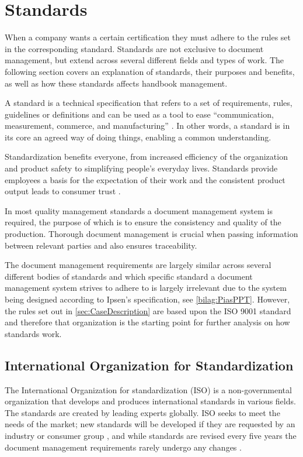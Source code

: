 \section{Standards} \label{sec:standards}
When a company wants a certain certification they must adhere to the rules set in the corresponding standard.
Standards are not exclusive to document management, but extend across several different fields and types of work.
The following section covers an explanation of standards, their purposes and benefits, as well as how these standards affects handbook management.

A standard is a technical specification that refers to a set of requirements, rules, guidelines or definitions \cite{Standard} and can be used as a tool to ease ``communication, measurement, commerce, and manufacturing'' \cite{Standardtool}.
In other words, a standard is in its core an agreed way of doing things, enabling a common understanding.

Standardization benefits everyone, from increased efficiency of the organization and product safety to simplifying people's everyday lives.
Standards provide employees a basis for the expectation of their work and the consistent product output leads to consumer trust \citep[p.~83]{Standardization}.

In most quality management standards a document management system is required, the purpose of which is to ensure the consistency and quality of the production.
Thorough document management is crucial when passing information between relevant parties and also ensures traceability.

The document management requirements are largely similar across several different bodies of standards and which specific standard a document management system strives to adhere to is largely irrelevant due to the system being designed according to Ipsen's specification, see \cref{bilag:PiasPPT}.
However, the rules set out in \cref{sec:CaseDescription} are based upon the ISO 9001 standard and therefore that organization is the starting point for further analysis on how standards work.

\subsection{International Organization for Standardization} \label{sec:ISOstandards}
The International Organization for standardization (ISO) is a non-governmental organization that develops and produces international standards in various fields.
The standards are created by leading experts globally. \cite{ISOinfo}
ISO seeks to meet the needs of the market; new standards will be developed if they are requested by an industry or consumer group \cite{ISOdeveloping}, and while standards are revised every five years the document management requirements rarely undergo any changes \cite{ISOreviewedevery5years}.

